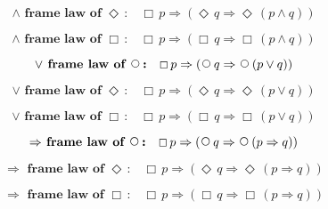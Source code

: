 \documentclass[12pt, fleqn, leqno]{article}
\newcommand{\impl}{\ensuremath{\Rightarrow}}        %
\newcommand{\Next}{\;\,\text{\raisebox{3.5pt}{\circle{6}}}}
\newcommand{\Event}{\Diamond\,}
\newcommand{\Always}{\Box\,}
\newcommand{\spacer}{\vspace{-30pt}}
\begin{document}
\spacer

\begin{equation}\label{E:framelawEvent}
\textbf{$\land$ frame law of $\Event$:}\quad \Always p \impl (\Event q \impl \Event (p \land q))
\end{equation}

\spacer

\begin{equation}\label{E:framelawAlways}
\textbf{$\land$ frame law of $\Always$:}\quad \Always p \impl (\Always q \impl \Always (p \land q))
\end{equation}


\spacer
\begin{equation}\label{E:disjframelawnext}
\textbf{$\lor$ frame law of $\Next$:}\quad \Always p \impl (\Next q \impl \Next (p \lor q))
\end{equation}

\spacer

\begin{equation}\label{E:disjframelawEvent}
\textbf{$\lor$ frame law of $\Event$:}\quad \Always p \impl (\Event q \impl \Event (p \lor q))
\end{equation}

\spacer

\begin{equation}\label{E:disjframelawAlways}
\textbf{$\lor$ frame law of $\Always$:}\quad \Always p \impl (\Always q \impl \Always (p \lor q))
\end{equation}

\spacer

\begin{equation}\label{E:implframelawnext}
\textbf{$\impl$ frame law of $\Next$:}\quad \Always p \impl (\Next q \impl \Next (p \impl q))
\end{equation}

\spacer

\begin{equation}\label{E:implframelawEvent}
\textbf{$\impl$ frame law of $\Event$:}\quad \Always p \impl (\Event q \impl \Event (p \impl q))
\end{equation}

\spacer

\begin{equation}\label{E:implframelawAlways}
\textbf{$\impl$ frame law of $\Always$:}\quad \Always p \impl (\Always q \impl \Always (p \impl q))
\end{equation}
\end{document}

